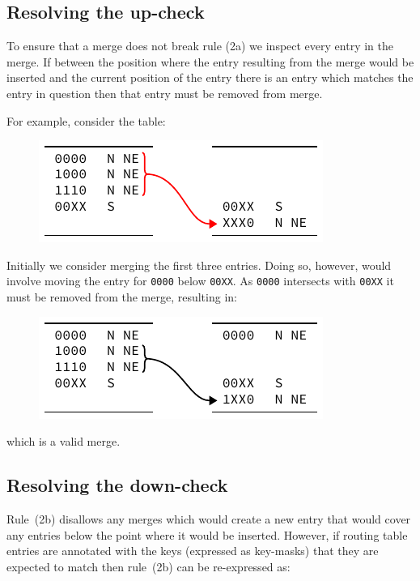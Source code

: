 \documentclass[conference]{IEEEtran}
\newcommand{\mytt}[1]{\texttt{\footnotesize#1}}
\begin{document}
  \subsection{Resolving the up-check}

  To ensure that a merge does not break rule (2a) we inspect every entry in the merge.
  If between the position where the entry resulting from the merge would be inserted and the current position of the entry there is an entry which matches the entry in question then that entry must be removed from merge.

  For example, consider the table:

  \begin{figure}[H]
    \centering
    \includegraphics{figures/upcheck_resolve_example_1}
  \end{figure}

  \noindent Initially we consider merging the first three entries.
  Doing so, however, would involve moving the entry for \mytt{0000} below \mytt{00XX}.
  As \mytt{0000} intersects with \mytt{00XX} it must be removed from the merge, resulting in:

  \begin{figure}[H]
    \centering
    \includegraphics{figures/upcheck_resolve_example_2}
  \end{figure}

  \noindent which is a valid merge.

  \subsection{Resolving the down-check}
  
  Rule~(2b) disallows any merges which would create a new entry that would cover any entries below the point where it would be inserted.
  However, if routing table entries are annotated with the keys (expressed as key-masks) that they are expected to match then rule~(2b) can be re-expressed as:
\end{document}
